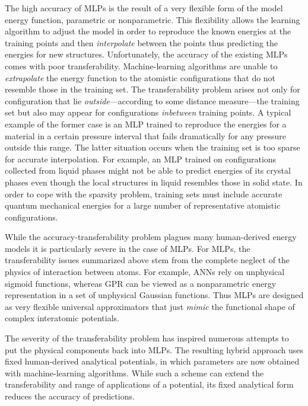 \documentclass[aps,prl,reprint,amsmath,amssymb,nature]{revtex4-1}
\begin{document}

The high accuracy of MLPs is the result of a very flexible form of the model energy function, parametric or nonparametric. 
This flexibility allows the learning algorithm to adjust the model in order to reproduce the known energies at the training points and then \textit{interpolate} between the points thus predicting the energies for new structures. 
Unfortunately, the accuracy of the existing MLPs comes with poor transferability. Machine-learning algorithms are unable to \textit{extrapolate} the energy function to the atomistic configurations that do not resemble those in the training set.
The transferability problem arises not only for configuration that lie \emph{outside}---according to some distance measure---the training set but also may appear for configurations \emph{inbetween} training points. 
A typical example of the former case is an MLP trained to reproduce the energies for a material in a certain pressure interval that fails dramatically for any pressure outside this range. 
The latter situation occurs when the training set is too sparse for accurate interpolation. For example, an MLP trained on configurations collected from liquid phases might not be able to predict energies of its crystal phases even though the local structures in liquid resembles those in solid state. 
In order to cope with the sparsity problem, training sets must include accurate quantum mechanical energies for a large number of representative atomistic configurations.%

While the accuracy-transferability problem plagues many human-derived energy models it is particularly severe in the case of MLPs. 
For MLPs, the transferability issues summarized above stem from the complete neglect of the physics of interaction between atoms. 
For example, ANNs rely on unphysical sigmoid functions, whereas GPR can be viewed as a nonparametric energy representation in a set of unphysical Gaussian functions. 
Thus MLPs are designed as very flexible universal approximators that just \emph{mimic} the functional shape of complex interatomic potentials. 

The severity of the transferability problem has inspired numerous attempts to put the physical components back into MLPs. 
The resulting hybrid approach uses fixed human-derived analytical potentials, in which parameters are now obtained with machine-learning algorithms. 
While such a scheme can extend the transferability and range of applications of a potential, its fixed analytical form reduces the accuracy of predictions.
\end{document}
